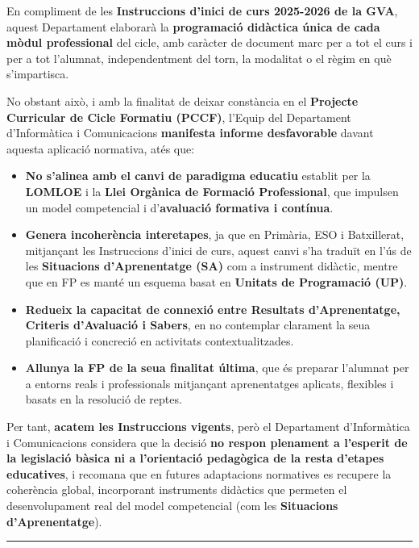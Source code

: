 \documentclass[
  paper=a4,
  ,captions=tableheading
]{scrartcl}
\providecommand{\tightlist}{%
  \setlength{\itemsep}{0pt}\setlength{\parskip}{0pt}}
\begin{document}
En compliment de les \textbf{Instruccions d'inici de curs 2025-2026 de
la GVA}, aquest Departament elaborarà la \textbf{programació didàctica
única de cada mòdul professional} del cicle, amb caràcter de document
marc per a tot el curs i per a tot l'alumnat, independentment del torn,
la modalitat o el règim en què s'impartisca.

No obstant això, i amb la finalitat de deixar constància en el
\textbf{Projecte Curricular de Cicle Formatiu (PCCF)}, l'Equip del
Departament d'Informàtica i Comunicacions \textbf{manifesta informe
desfavorable} davant aquesta aplicació normativa, atés que:

\begin{itemize}
\tightlist
\item
  \textbf{No s'alinea amb el canvi de paradigma educatiu} establit per
  la \textbf{LOMLOE} i la \textbf{Llei Orgànica de Formació
  Professional}, que impulsen un model competencial i
  d'\textbf{avaluació formativa i contínua}.
\item
  \textbf{Genera incoherència interetapes}, ja que en Primària, ESO i
  Batxillerat, mitjançant les Instruccions d'inici de curs, aquest canvi
  s'ha traduït en l'ús de les \textbf{Situacions d'Aprenentatge (SA)}
  com a instrument didàctic, mentre que en FP es manté un esquema basat
  en \textbf{Unitats de Programació (UP)}.
\item
  \textbf{Redueix la capacitat de connexió entre Resultats
  d'Aprenentatge, Criteris d'Avaluació i Sabers}, en no contemplar
  clarament la seua planificació i concreció en activitats
  contextualitzades.
\item
  \textbf{Allunya la FP de la seua finalitat última}, que és preparar
  l'alumnat per a entorns reals i professionals mitjançant aprenentatges
  aplicats, flexibles i basats en la resolució de reptes.
\end{itemize}

Per tant, \textbf{acatem les Instruccions vigents}, però el Departament
d'Informàtica i Comunicacions considera que la decisió \textbf{no respon
plenament a l'esperit de la legislació bàsica ni a l'orientació
pedagògica de la resta d'etapes educatives}, i recomana que en futures
adaptacions normatives es recupere la coherència global, incorporant
instruments didàctics que permeten el desenvolupament real del model
competencial (com les \textbf{Situacions d'Aprenentatge}).

\begin{center}\rule{0.5\linewidth}{0.5pt}\end{center}
\end{document}
